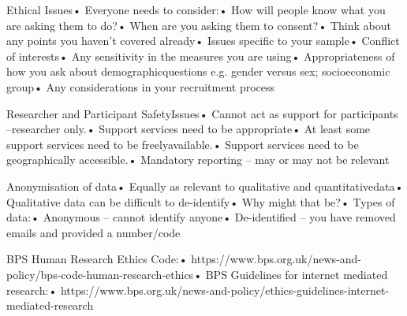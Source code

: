 \documentclass[jou, 12pt]{apa7}
\begin{document}
Ethical Issues• Everyone needs to consider:• How will people know what you are asking them to do?• When are you asking them to consent?• Think about any points you haven’t covered already• Issues specific to your sample• Conflict of interests• Any sensitivity in the measures you are using• Appropriateness of how you ask about demographicquestions e.g. gender versus sex; socioeconomic group• Any considerations in your recruitment process



Researcher and Participant SafetyIssues• Cannot act as support for participants –researcher only.• Support services need to be appropriate• At least some support services need to be freelyavailable.• Support services need to be geographically accessible.• Mandatory reporting – may or may not be relevant



Anonymisation of data• Equally as relevant to qualitative and quantitativedata• Qualitative data can be difficult to de-identify• Why might that be?• Types of data:• Anonymous – cannot identify anyone• De-identified – you have removed emails and provided a number/code



BPS Human Research Ethics Code:• https://www.bps.org.uk/news-and-policy/bps-code-human-research-ethics• BPS Guidelines for internet mediated research:• https://www.bps.org.uk/news-and-policy/ethics-guidelines-internet-mediated-research
\end{document}
